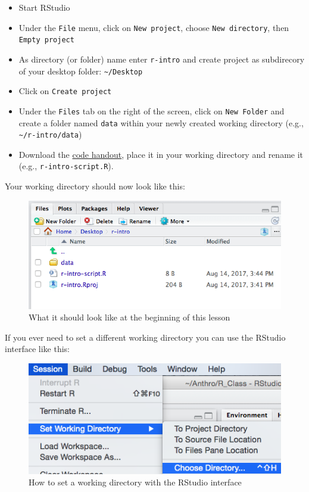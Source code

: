 \documentclass[]{book}
\providecommand{\tightlist}{%
  \setlength{\itemsep}{0pt}\setlength{\parskip}{0pt}}
\theoremstyle{definition}
\theoremstyle{definition}
\theoremstyle{remark}
\begin{document}
\begin{itemize}
\tightlist
\item
  Start RStudio
\item
  Under the \texttt{File} menu, click on \texttt{New\ project}, choose
  \texttt{New\ directory}, then \texttt{Empty\ project}
\item
  As directory (or folder) name enter \texttt{r-intro} and create
  project as subdirecory of your desktop folder:
  \texttt{\textasciitilde{}/Desktop}\\
\item
  Click on \texttt{Create\ project}
\item
  Under the \texttt{Files} tab on the right of the screen, click on
  \texttt{New\ Folder} and create a folder named \texttt{data} within
  your newly created working directory (e.g.,
  \texttt{\textasciitilde{}/r-intro/data})
\item
  Download the \href{./code-handout.R}{code handout}, place it in your
  working directory and rename it (e.g., \texttt{r-intro-script.R}).
\end{itemize}

Your working directory should now look like this:

\begin{figure}
\includegraphics[width=0.8\linewidth]{img/Rproject-setup} \caption{What it should look like at the beginning of this lesson}\label{fig:working-dir}
\end{figure}

If you ever need to set a different working directory you can use the
RStudio interface like this:

\begin{figure}
\includegraphics[width=0.6\linewidth]{img/setWD} \caption{How to set a working directory with the RStudio interface}\label{fig:set-working-dir}
\end{figure}
\end{document}
